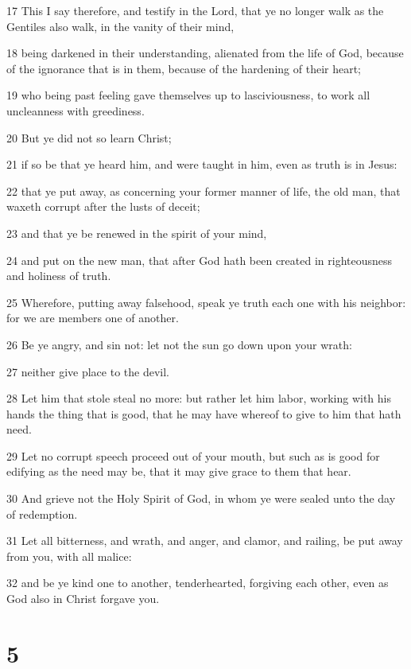 \par 17 This I say therefore, and testify in the Lord, that ye no longer walk as the Gentiles also walk, in the vanity of their mind,
\par 18 being darkened in their understanding, alienated from the life of God, because of the ignorance that is in them, because of the hardening of their heart;
\par 19 who being past feeling gave themselves up to lasciviousness, to work all uncleanness with greediness.
\par 20 But ye did not so learn Christ;
\par 21 if so be that ye heard him, and were taught in him, even as truth is in Jesus:
\par 22 that ye put away, as concerning your former manner of life, the old man, that waxeth corrupt after the lusts of deceit;
\par 23 and that ye be renewed in the spirit of your mind,
\par 24 and put on the new man, that after God hath been created in righteousness and holiness of truth.
\par 25 Wherefore, putting away falsehood, speak ye truth each one with his neighbor: for we are members one of another.
\par 26 Be ye angry, and sin not: let not the sun go down upon your wrath:
\par 27 neither give place to the devil.
\par 28 Let him that stole steal no more: but rather let him labor, working with his hands the thing that is good, that he may have whereof to give to him that hath need.
\par 29 Let no corrupt speech proceed out of your mouth, but such as is good for edifying as the need may be, that it may give grace to them that hear.
\par 30 And grieve not the Holy Spirit of God, in whom ye were sealed unto the day of redemption.
\par 31 Let all bitterness, and wrath, and anger, and clamor, and railing, be put away from you, with all malice:
\par 32 and be ye kind one to another, tenderhearted, forgiving each other, even as God also in Christ forgave you.

\chapter{5}

